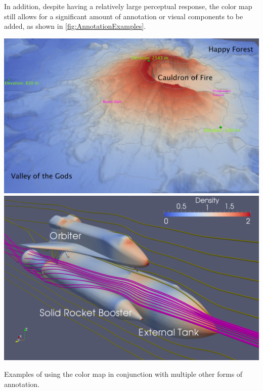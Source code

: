 \documentclass{llncs}
\begin{document}


In addition, despite having a relatively large perceptual response, the
color map still allows for a significant amount of annotation or visual
components to be added, as shown in \autoref{fig:AnnotationExamples}.



\begin{plate}
  \centering
  \includegraphics[height=0.31\linewidth]{images/AnnotationExample}
  \includegraphics[height=0.31\linewidth]{images/ShuttleExample}
  \caption{Examples of using the color map in conjunction with multiple
    other forms of annotation.}
  \label{fig:AnnotationExamples}
\end{plate}
\end{document}

